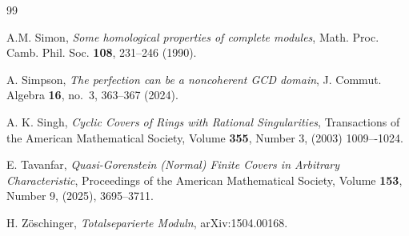 \documentclass[12pt,reqno]{amsart}
\theoremstyle{definition}
\theoremstyle{remark}
\theoremstyle{cited}
\theoremstyle{remark}
\theoremstyle{citeddef}
\begin{document}
\begin{thebibliography}{99}
		
		
		A.M. Simon, \emph{Some homological properties of complete modules}, Math. Proc. Camb. Phil. Soc.
		{\bf108}, 231--246 (1990).
		
		A. Simpson,
		\emph{The perfection can be a noncoherent GCD domain},
		J. Commut. Algebra {\bf16}, no.~3, 363--367 (2024).
		
		A. K. Singh, 
		\emph{Cyclic Covers of Rings with Rational Singularities},
		Transactions of the American Mathematical Society, Volume {\bf355}, Number 3, (2003)  1009–-1024.
		
		E. Tavanfar,
		\emph{Quasi-Gorenstein (Normal) Finite Covers in Arbitrary Characteristic},
		Proceedings of the American Mathematical Society, Volume {\bf 153}, Number 9, (2025), 3695--3711.
		
		H. Z\"oschinger,
		\emph{Totalseparierte Moduln},
		arXiv:1504.00168.
		
		
		
	\end{thebibliography}
	
\end{document}
